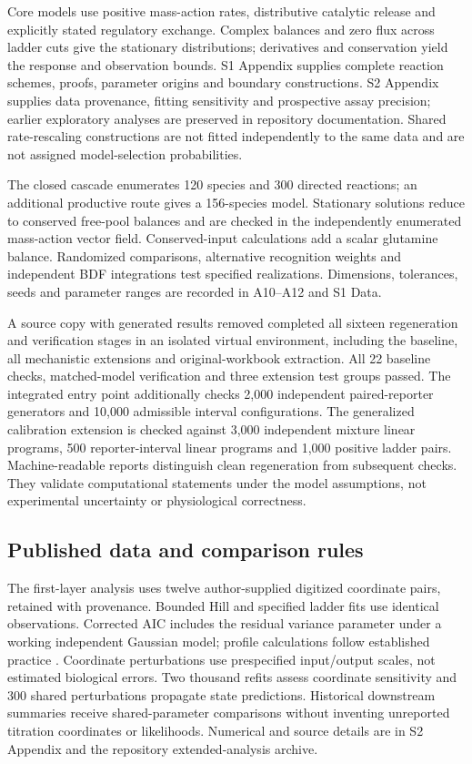 \documentclass[10pt,letterpaper]{article}
\begin{document}
Core models use positive mass-action rates, distributive catalytic release and explicitly stated regulatory exchange. Complex balances and zero flux across ladder cuts give the stationary distributions; derivatives and conservation yield the response and observation bounds. S1 Appendix supplies complete reaction schemes, proofs, parameter origins and boundary constructions. S2 Appendix supplies data provenance, fitting sensitivity and prospective assay precision; earlier exploratory analyses are preserved in repository documentation. Shared rate-rescaling constructions are not fitted independently to the same data and are not assigned model-selection probabilities.

The closed cascade enumerates 120 species and 300 directed reactions; an additional productive route gives a 156-species model. Stationary solutions reduce to conserved free-pool balances and are checked in the independently enumerated mass-action vector field. Conserved-input calculations add a scalar glutamine balance. Randomized comparisons, alternative recognition weights and independent BDF integrations test specified realizations. Dimensions, tolerances, seeds and parameter ranges are recorded in A10--A12 and S1 Data.

A source copy with generated results removed completed all sixteen regeneration and verification stages in an isolated virtual environment, including the baseline, all mechanistic extensions and original-workbook extraction. All 22 baseline checks, matched-model verification and three extension test groups passed. The integrated entry point additionally checks 2,000 independent paired-reporter generators and 10,000 admissible interval configurations. The generalized calibration extension is checked against 3,000 independent mixture linear programs, 500 reporter-interval linear programs and 1,000 positive ladder pairs. Machine-readable reports distinguish clean regeneration from subsequent checks. They validate computational statements under the model assumptions, not experimental uncertainty or physiological correctness.

\subsection*{Published data and comparison rules}

The first-layer analysis uses twelve author-supplied digitized coordinate pairs, retained with provenance. Bounded Hill and specified ladder fits use identical observations. Corrected AIC includes the residual variance parameter under a working independent Gaussian model; profile calculations follow established practice \cite{r74}. Coordinate perturbations use prespecified input/output scales, not estimated biological errors. Two thousand refits assess coordinate sensitivity and 300 shared perturbations propagate state predictions. Historical downstream summaries receive shared-parameter comparisons without inventing unreported titration coordinates or likelihoods. Numerical and source details are in S2 Appendix and the repository extended-analysis archive.
\end{document}
